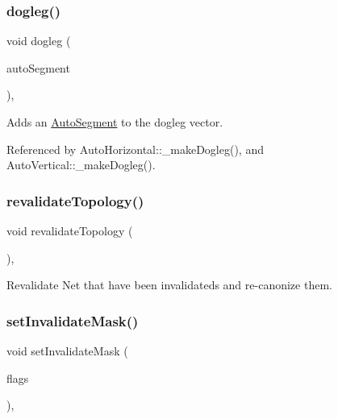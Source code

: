 \mbox{\label{classKatabatic_1_1Session_aed01e83f7d8dc7acd85156256a9e776c}} 
\subsubsection{\texorpdfstring{dogleg()}{dogleg()}}
{\footnotesize\ttfamily void dogleg (\begin{DoxyParamCaption}\item[{\mbox{\hyperlink{classKatabatic_1_1AutoSegment}{Auto\+Segment}} $\ast$}]{auto\+Segment }\end{DoxyParamCaption})\hspace{0.3cm}{\ttfamily [inline]}, {\ttfamily [static]}}

Adds an \mbox{\hyperlink{classKatabatic_1_1AutoSegment}{Auto\+Segment}} to the dogleg vector. 

Referenced by Auto\+Horizontal\+::\+\_\+make\+Dogleg(), and Auto\+Vertical\+::\+\_\+make\+Dogleg().

\mbox{\label{classKatabatic_1_1Session_a69fc41ca90fae86766ae9d528394868f}} 
\subsubsection{\texorpdfstring{revalidate\+Topology()}{revalidateTopology()}}
{\footnotesize\ttfamily void revalidate\+Topology (\begin{DoxyParamCaption}{ }\end{DoxyParamCaption})\hspace{0.3cm}{\ttfamily [inline]}, {\ttfamily [static]}}

Revalidate Net that have been invalidateds and re-\/canonize them. \mbox{\label{classKatabatic_1_1Session_a16f4761496e07b9e836642d1effa1993}} 
\subsubsection{\texorpdfstring{set\+Invalidate\+Mask()}{setInvalidateMask()}}
{\footnotesize\ttfamily void set\+Invalidate\+Mask (\begin{DoxyParamCaption}\item[{unsigned int}]{flags }\end{DoxyParamCaption})\hspace{0.3cm}{\ttfamily [inline]}, {\ttfamily [static]}}

